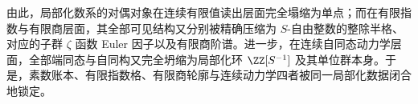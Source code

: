 \noindent
由此，局部化数系的对偶对象在连续有限值读出层面完全塌缩为单点；而在有限指数与有限商层面，其全部可见结构又分别被精确压缩为 \(S\)-自由整数的整除半格、对应的子群 \(\zeta\) 函数 Euler 因子以及有限商阶谱。进一步，在连续自同态动力学层面，全部端同态与自同构又完全坍缩为局部化环 \(\ZZ[S^{-1}]\) 及其单位群本身。于是，素数账本、有限指数格、有限商轮廓与连续动力学四者被同一局部化数据闭合地锁定。



\endinput
